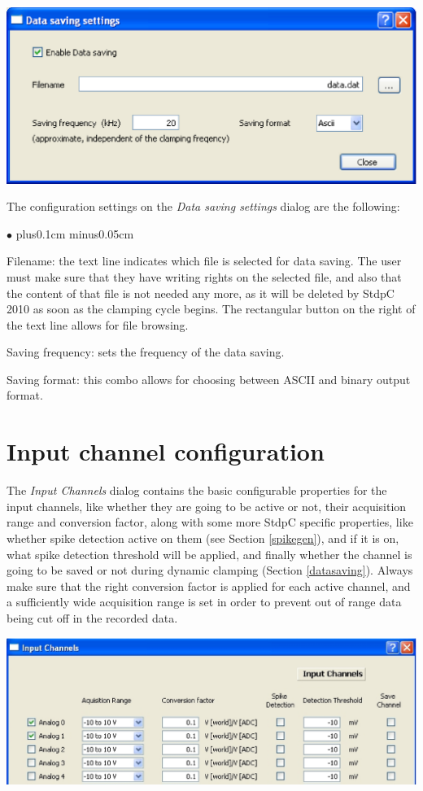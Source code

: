 \documentclass{article}
\newenvironment{myitem}{\begin{list}{$\bullet$}{\setlength{\leftmargin}{1.1em}
\itemsep0.1cm plus0.1cm minus0.05cm
\listparindent0cm
\addtolength{\labelsep}{0.5\labelsep}
\setlength{\labelwidth}{0.8em}
\setlength{\leftmargin}{\labelwidth}
\addtolength{\leftmargin}{\labelsep}
}}{\end{list}}
\begin{document}
\includegraphics[scale=0.6]{dataSavingDialog}

The configuration settings on the \emph{Data saving settings} dialog are
the following:
\begin{myitem}
\item Filename: the text line indicates which file is selected for data
  saving. The user must make sure that they have writing rights on the
  selected file, and also that the content of that file is not needed any
  more, as it will be deleted by StdpC 2010 as soon as the clamping cycle
  begins. The rectangular button on the right of the text line allows for
  file browsing.
\item Saving frequency: sets the frequency of the data saving.
\item Saving format: this combo allows for choosing between ASCII and
  binary output format.
\end{myitem}


\section{Input channel configuration} \label{inchnconfig}

The \emph{Input Channels} dialog contains the basic configurable
properties for the input channels, like whether they are going to be
active or not, their acquisition range and conversion factor, along
with some more StdpC specific properties, like whether spike detection
active on them (see Section \ref{spikegen}), and if it is on, what
spike detection threshold will be applied, and finally whether the
channel is going to be saved or not during dynamic clamping (Section
\ref{datasaving}). Always make sure that the right conversion factor
is applied for each active channel, and a sufficiently wide
acquisition range is set in order to prevent out of range data being
cut off in the recorded data.

\includegraphics[scale=0.6]{inputChnDialog}
\end{document}
